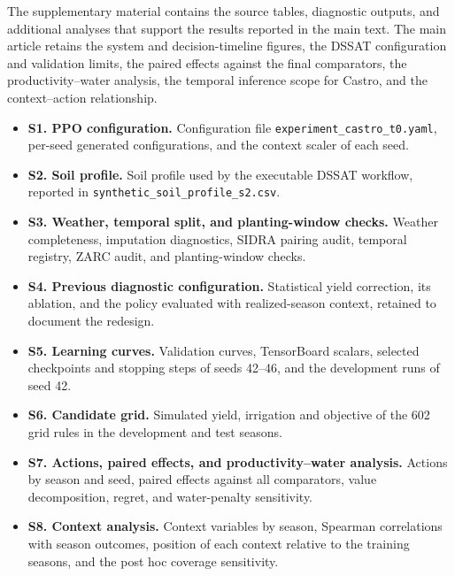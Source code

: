 \documentclass[times,final,authoryear]{elsarticle}
\begin{document}
The supplementary material contains the source tables, diagnostic outputs, and additional analyses that support the results reported in the main text. The main article retains the system and decision-timeline figures, the DSSAT configuration and validation limits, the paired effects against the final comparators, the productivity--water analysis, the temporal inference scope for Castro, and the context--action relationship.

\begin{itemize}
\item \textbf{S1. PPO configuration.} Configuration file \texttt{experiment\_castro\_t0.yaml}, per-seed generated configurations, and the context scaler of each seed.
\item \textbf{S2. Soil profile.} Soil profile used by the executable DSSAT workflow, reported in \texttt{synthetic\_soil\_profile\_s2.csv}.
\item \textbf{S3. Weather, temporal split, and planting-window checks.} Weather completeness, imputation diagnostics, SIDRA pairing audit, temporal registry, ZARC audit, and planting-window checks.
\item \textbf{S4. Previous diagnostic configuration.} Statistical yield correction, its ablation, and the policy evaluated with realized-season context, retained to document the redesign.
\item \textbf{S5. Learning curves.} Validation curves, TensorBoard scalars, selected checkpoints and stopping steps of seeds 42--46, and the development runs of seed 42.
\item \textbf{S6. Candidate grid.} Simulated yield, irrigation and objective of the 602 grid rules in the development and test seasons.
\item \textbf{S7. Actions, paired effects, and productivity--water analysis.} Actions by season and seed, paired effects against all comparators, value decomposition, regret, and water-penalty sensitivity.
\item \textbf{S8. Context analysis.} Context variables by season, Spearman correlations with season outcomes, position of each context relative to the training seasons, and the post hoc coverage sensitivity.
\end{itemize}






\end{document}
